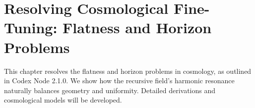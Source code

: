 \section{Resolving Cosmological Fine-Tuning: Flatness and Horizon Problems}
This chapter resolves the flatness and horizon problems in cosmology, as outlined in Codex Node 2.1.0. We show how the recursive field’s harmonic resonance naturally balances geometry and uniformity. Detailed derivations and cosmological models will be developed.
